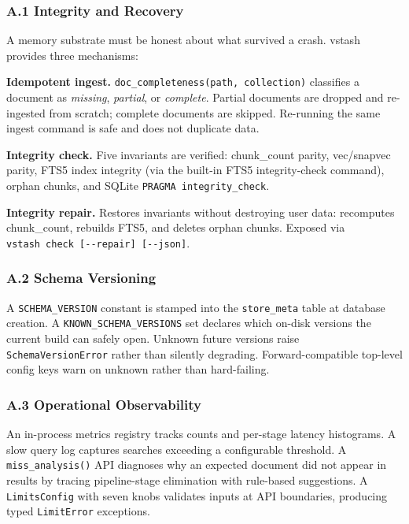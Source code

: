 \documentclass[
  11pt]{article}
\begin{document}
\subsubsection{A.1 Integrity and Recovery}\label{a.1-integrity-and-recovery}

A memory substrate must be honest about what survived a crash. vstash provides three mechanisms:

\textbf{Idempotent ingest.} \texttt{doc\_completeness(path,\ collection)} classifies a document as \emph{missing}, \emph{partial}, or \emph{complete}. Partial documents are dropped and re-ingested from scratch; complete documents are skipped. Re-running the same ingest command is safe and does not duplicate data.

\textbf{Integrity check.} Five invariants are verified: chunk\_count parity, vec/snapvec parity, FTS5 index integrity (via the built-in FTS5 integrity-check command), orphan chunks, and SQLite \texttt{PRAGMA\ integrity\_check}.

\textbf{Integrity repair.} Restores invariants without destroying user data: recomputes chunk\_count, rebuilds FTS5, and deletes orphan chunks. Exposed via \texttt{vstash\ check\ {[}-\/-repair{]}\ {[}-\/-json{]}}.

\subsubsection{A.2 Schema Versioning}\label{a.2-schema-versioning}

A \texttt{SCHEMA\_VERSION} constant is stamped into the \texttt{store\_meta} table at database creation. A \texttt{KNOWN\_SCHEMA\_VERSIONS} set declares which on-disk versions the current build can safely open. Unknown future versions raise \texttt{SchemaVersionError} rather than silently degrading. Forward-compatible top-level config keys warn on unknown rather than hard-failing.

\subsubsection{A.3 Operational Observability}\label{a.3-operational-observability}

An in-process metrics registry tracks counts and per-stage latency histograms. A slow query log captures searches exceeding a configurable threshold. A \texttt{miss\_analysis()} API diagnoses why an expected document did not appear in results by tracing pipeline-stage elimination with rule-based suggestions. A \texttt{LimitsConfig} with seven knobs validates inputs at API boundaries, producing typed \texttt{LimitError} exceptions.
\end{document}
